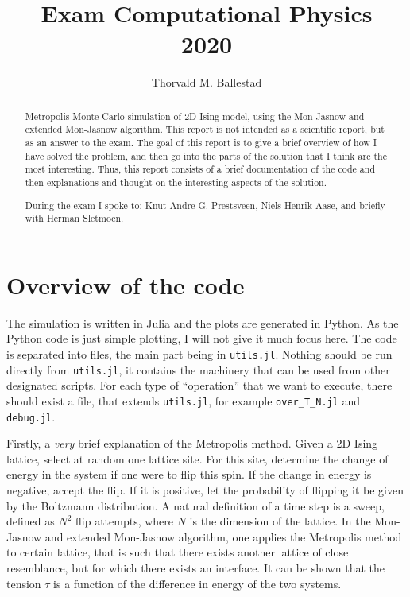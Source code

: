 \documentclass[12pt, a4paper]{article}
\title{Exam Computational Physics\\
  2020}
\author{Thorvald M. Ballestad}
\begin{document}
\maketitle
\begin{abstract}
  Metropolis Monte Carlo simulation of 2D Ising model, using the Mon-Jasnow and extended Mon-Jasnow algorithm.
  This report is not intended as a scientific report, but as an answer to the exam.
  The goal of this report is to give a brief overview of how I have solved the problem, and then go into the parts of the solution that I think are the most interesting.
  Thus, this report consists of a brief documentation of the code and then explanations and thought on the interesting aspects of the solution.


  During the exam I spoke to: Knut Andre G. Prestsveen, Niels Henrik Aase, and briefly with Herman Sletmoen.
\end{abstract}

\section{Overview of the code}
The simulation is written in Julia and the plots are generated in Python.
As the Python code is just simple plotting, I will not give it much focus here.
The code is separated into files, the main part being in \verb|utils.jl|.
Nothing should be run directly from \verb|utils.jl|, it contains the machinery that can be used from other designated scripts.
For each type of ``operation'' that we want to execute, there should exist a file, that extends \verb|utils.jl|, for example \verb|over_T_N.jl| and \verb|debug.jl|.

Firstly, a \emph{very} brief explanation of the Metropolis method.
Given a 2D Ising lattice, select at random one lattice site.
For this site, determine the change of energy in the system if one were to flip this spin.
If the change in energy is negative, accept the flip.
If it is positive, let the probability of flipping it be given by the Boltzmann distribution.
A natural definition of a time step is a sweep, defined as $N^2$ flip attempts, where $N$ is the dimension of the lattice.
In the Mon-Jasnow and extended Mon-Jasnow algorithm, one applies the Metropolis method to certain lattice, that is such that there exists another lattice of close resemblance, but for which there exists an interface.
It can be shown that the tension $\tau$ is a function of the difference in energy of the two systems.
\end{document}
